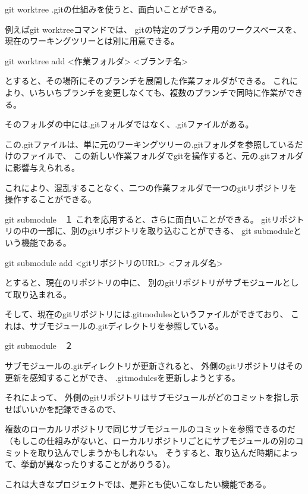 \documentclass[12pt, unicode]{beamer}
\begin{document}
\begin{frame}{git worktree}
.gitの仕組みを使うと、面白いことができる。

例えばgit worktreeコマンドでは、
gitの特定のブランチ用のワークスペースを、現在のワーキングツリーとは別に用意できる。

git worktree add <作業フォルダ> <ブランチ名>

とすると、その場所にそのブランチを展開した作業フォルダができる。
これにより、いちいちブランチを変更しなくても、複数のブランチで同時に作業ができる。

そのフォルダの中には.gitフォルダではなく、.gitファイルがある。

この.gitファイルは、単に元のワーキングツリーの.gitフォルダを参照しているだけのファイルで、
この新しい作業フォルダでgitを操作すると、元の.gitフォルダに影響与えられる。

これにより、混乱することなく、二つの作業フォルダで一つのgitリポジトリを操作することができる。

\end{frame}
\begin{frame}{git submodule　１}
これを応用すると、さらに面白いことができる。
gitリポジトリの中の一部に、別のgitリポジトリを取り込むことができる、
git submoduleという機能である。

git submodule add <gitリポジトリのURL> <フォルダ名>

とすると、現在のリポジトリの中に、
別のgitリポジトリがサブモジュールとして取り込まれる。

そして、現在のgitリポジトリには.gitmodulesというファイルができており、
これは、サブモジュールの.gitディレクトリを参照している。

\end{frame}
\begin{frame}{git submodule　２}

サブモジュールの.gitディレクトリが更新されると、
外側のgitリポジトリはその更新を感知することができ、
.gitmodulesを更新しようとする。

それによって、
外側のgitリポジトリはサブモジュールがどのコミットを指し示せばいいかを記録できるので、

複数のローカルリポジトリで同じサブモジュールのコミットを参照できるのだ
（もしこの仕組みがないと、ローカルリポジトリごとにサブモジュールの別のコミットを取り込んでしまうかもしれない。
そうすると、取り込んだ時期によって、挙動が異なったりすることがありうる）。

これは大きなプロジェクトでは、是非とも使いこなしたい機能である。

\end{frame}
\end{document}
